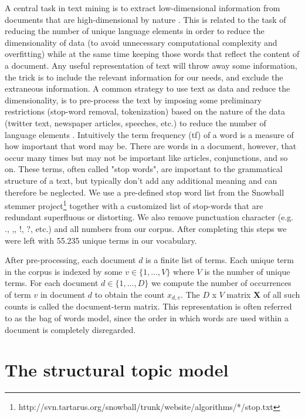 \documentclass[12pt,a4paper,notitlepage]{article}
\begin{document}

A central task in text mining is to extract low-dimensional information from documents that are high-dimensional by nature \citep{bholat_text_2015}. This is related to the task of reducing the number of unique language elements in order to reduce the dimensionality of data (to avoid unnecessary computational complexity and overfitting) while at the same time keeping those words that reflect the content of a document. Any useful representation of text will throw away some information, the trick is to include the relevant information for our needs, and exclude the extraneous information. A common strategy to use text as data and reduce the dimensionality, is to pre-process the text by imposing some preliminary restrictions (stop-word removal, tokenization) based on the nature of the data (twitter text, newspaper articles, speeches, etc.) to reduce the number of language elements \citep{gentzkow_text_2017}. Intuitively the term frequency (tf) of a word is a measure of how important that word may be. There are words in a document, however, that occur many times but may not be important like articles, conjunctions, and so on. These terms, often called "stop words", are important to the grammatical structure of a text, but typically don't add any additional meaning and can therefore be neglected. We use a pre-defined stop word list from the Snowball stemmer project\footnote{http://svn.tartarus.org/snowball/trunk/website/algorithms/*/stop.txt} together with a customized list of stop-words that are redundant superfluous or distorting. We also remove punctuation character (e.g. ., ,, !, ?, etc.) and all numbers from our corpus. After completing this steps we were left with 55.235 unique terms in our vocabulary.

After pre-processing, each document $d$ is a finite list of terms. Each unique term in the corpus is indexed by some $v \in \lbrace 1,...,V \rbrace$ where $V$ is the number of unique terms. For each document $d \in \lbrace 1,...,D \rbrace$ we compute the number of occurrences of term $v$ in document $d$ to obtain the count $x_{d,v}$. The $D$ x $V$ matrix $\boldsymbol{X}$ of all such counts is called the document-term matrix. This representation is often referred to as the bag of words model, since the order in which words are used within a document is completely disregarded. 

\section{The structural topic model}\label{ch_model}
\end{document}
